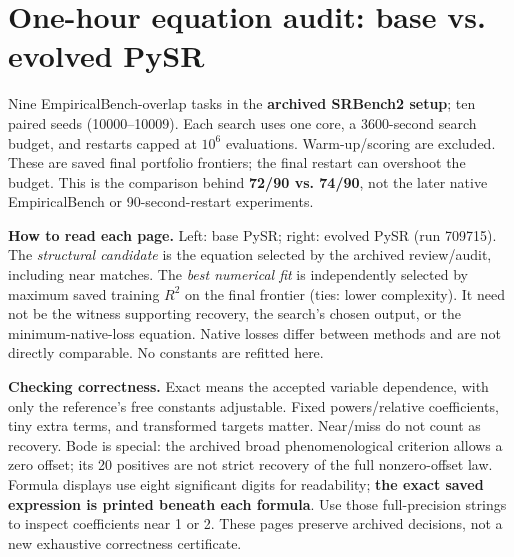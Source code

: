 \documentclass[10pt,letterpaper,landscape]{article}
\begin{document}
\section*{One-hour equation audit: base vs. evolved PySR}
Nine EmpiricalBench-overlap tasks in the \textbf{archived SRBench2 setup}; ten paired seeds (10000--10009).
Each search uses one core, a 3600-second search budget, and restarts capped at $10^6$ evaluations.
Warm-up/scoring are excluded. These are saved final portfolio frontiers; the final restart can overshoot the budget.
This is the comparison behind \textbf{72/90 vs. 74/90}, not the later native EmpiricalBench or 90-second-restart experiments.

\textbf{How to read each page.} Left: base PySR; right: evolved PySR (run 709715).
The \emph{structural candidate} is the equation selected by the archived review/audit, including near matches.
The \emph{best numerical fit} is independently selected by maximum saved training $R^2$ on the final frontier (ties: lower complexity).
It need not be the witness supporting recovery, the search's chosen output, or the minimum-native-loss equation.
Native losses differ between methods and are not directly comparable. No constants are refitted here.

\textbf{Checking correctness.} Exact means the accepted variable dependence, with only the reference's free constants adjustable.
Fixed powers/relative coefficients, tiny extra terms, and transformed targets matter. Near/miss do not count as recovery.
Bode is special: the archived broad phenomenological criterion allows a zero offset; its 20 positives are not strict recovery of the full nonzero-offset law.
Formula displays use eight significant digits for readability; \textbf{the exact saved expression is printed beneath each formula}.
Use those full-precision strings to inspect coefficients near 1 or 2. These pages preserve archived decisions, not a new exhaustive correctness certificate.
\end{document}

